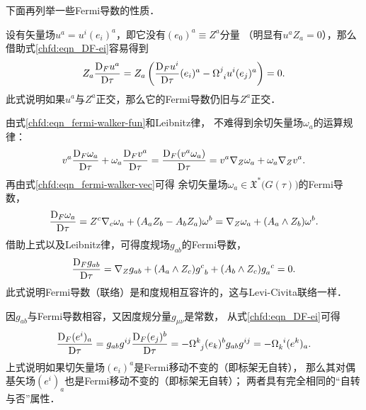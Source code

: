 下面再列举一些Fermi导数的性质．

设有矢量场$u^a = u^i (e_i)^a$，即它没有$(e_0)^a\equiv Z^a$分量
（明显有$u^a Z_a =0$），那么借助式\eqref{chfd:eqn_DF-ei}容易得到
\begin{equation}\label{chfd:eqn_DFuz=0}
    Z_a \frac{{\rm D}_F u^a}{{\rm D}\tau} =
    Z_a \left( \frac{{\rm D}_F u^i}{{\rm D}\tau} (e_i)^a
     -\Omega^{j}_{\hphantom{j} i} u^i (e_j)^a  \right) = 0.
\end{equation}
此式说明如果$u^a$与$Z^a$正交，那么它的Fermi导数仍旧与$Z^a$正交．


由式\eqref{chfd:eqn_fermi-walker-fun}和Leibnitz律，
不难得到余切矢量场$\omega_a$的运算规律：
\begin{equation*}
    v^a \frac{{\rm D}_F \omega_a}{{\rm D}\tau}
    +\omega_a \frac{{\rm D}_F v^a }{{\rm D}\tau}
    =\frac{{\rm D}_F (v^a \omega_a)}{{\rm D}\tau}
    =v^a \nabla_Z \omega_a + \omega_a\nabla_Z v^a .
\end{equation*}
再由式\eqref{chfd:eqn_fermi-walker-vec}可得
余切矢量场$\omega_a\in \mathfrak{X}^*\bigl(G(\tau)\bigr)$的Fermi导数，
\begin{equation}\label{chfd:eqn_fermi-walker-covec}
    \frac{{\rm D}_F \omega_a}{{\rm D}\tau} =  Z^c \nabla_c \omega_a
    +(A_a Z_b-A_b Z_a) \omega^b = \nabla_Z \omega_a + (A_a\wedge Z_b) \omega^b.
\end{equation}
借助上式以及Leibnitz律，可得度规场$g_{ab}$的Fermi导数，
\begin{equation}\label{chfd:eqn_FD-comp}
    \frac{{\rm D}_F g_{ab}}{{\rm D}\tau}= \nabla_Z g_{ab}
    + (A_a\wedge Z_c) g_{\hphantom{a} b}^c + (A_b\wedge Z_c) g_{a}^{\hphantom{a} c} =0.
\end{equation}
此式说明Fermi导数（联络）是和度规相互容许的，这与Levi-Civita联络一样．

因$g_{ab}$与Fermi导数相容，又因度规分量$g_{\mu\nu}$是常数，
从式\eqref{chfd:eqn_DF-ei}可得
\begin{equation}
    \frac{{\rm D}_F (e^i)_a}{{\rm D}\tau} = g_{ab}g^{ij}\frac{{\rm D}_F (e_j)^b}{{\rm D}\tau}
    = -\Omega^{k}_{\hphantom{k} j} (e_k)^b  g_{ab}g^{ij} =  -\Omega^{\hphantom{k} i}_{k} (e^k)_a .
\end{equation}
上式说明如果切矢量场$(e_i)^a$是Fermi移动不变的（即标架无自转），
那么其对偶基矢场$(e^i)_a$也是Fermi移动不变的（即标架无自转）；
两者具有完全相同的“自转与否”属性．


